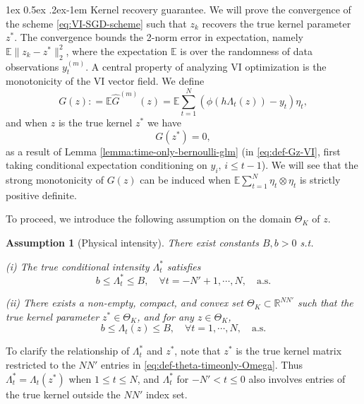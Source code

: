 \documentclass[11pt]{article}
\makeatletter
\newtheorem{assumption}{Assumption}
\theoremstyle{remark}
\theoremstyle{plain}
\newcommand{\E}{\mathbb{E}}
\newcommand{\R}{\mathbb{R}}
\renewcommand{\paragraph}{%
  \@startsection{paragraph}{4}%
  {\z@}{1ex \@plus 0.5ex \@minus .2ex}{-1em}%
  {\normalfont\normalsize\itshape}%
}
\makeatother
\begin{document}
\paragraph{Kernel recovery guarantee.}
We will prove the convergence of the scheme \eqref{eq:VI-SGD-scheme} such that $z_k$ recovers the true kernel parameter $z^*$.
The convergence bounds the 2-norm error in expectation, namely $\E \| z_k - z^*\|_2^2 $, where the expectation $\E$ is over the randomness of data observations $y_t^{(m)}$. 
%
A central property of analyzing VI optimization is the monotonicity of the VI vector field. We define
\begin{equation}\label{eq:def-Gz-VI}
{G}( z)
: =  \E \hat G^{(m)}( z ) 
= \E \sum_{t=1}^N \left(\phi( h \Lambda_t (z)) - y_t \right) \eta_t,
\end{equation}
and when $z$ is the true kernel $z^*$ we have
\begin{equation}\label{eq:G(zstar)=0}
G(z^*) = 0,
\end{equation}
as a result of Lemma \ref{lemma:time-only-bernoulli-glm} (in \eqref{eq:def-Gz-VI}, first taking conditional expectation conditioning on $y_i,\, i\le t-1$).
We will see that the strong monotonicity of $G(z)$ can be induced when $\E \sum_{t= 1}^N \eta_t \otimes \eta_t $ is strictly positive definite. 

To proceed, we introduce the following assumption on the domain $\Theta_K$ of $z$.

\begin{assumption}[Physical intensity]\label{assump:c1-Lambda-on-data}
There exist constants  $B, b > 0 $ s.t.

(i) The true conditional intensity $\Lambda_t^*$ satisfies 
\begin{equation}\label{eq:assump-Lamdbat-star} 
b \le \Lambda_t^* \le B, \quad \forall t= -N'+1, \cdots, N, \quad \text{a.s.}
\end{equation}

(ii)  There exists a non-empty, compact, and convex set $\Theta_K \subset \R^{NN'}$
such that the true kernel parameter  $z^* \in \Theta_K $, and for any $z \in \Theta_K$,
\begin{equation}\label{eq:assump-Lamdbat-b} 
b \le \Lambda_t( z )  \le B, \quad 
\forall t= 1, \cdots, N, \quad \text{a.s.}
\end{equation}

\end{assumption}

To clarify the relationship of $\Lambda_t^*$ and $z^*$, note that $z^*$ is the true kernel matrix restricted to the $NN'$ entries in \eqref{eq:def-theta-timeonly-Omega}. Thus $\Lambda_t^*  = \Lambda_t(z^*) $ when $ 1 \le t \le N $, 
and $\Lambda_t^*$ for $ -N' < t \le 0 $ also involves entries of the true kernel outside the $N N'$ index set.
\end{document}
